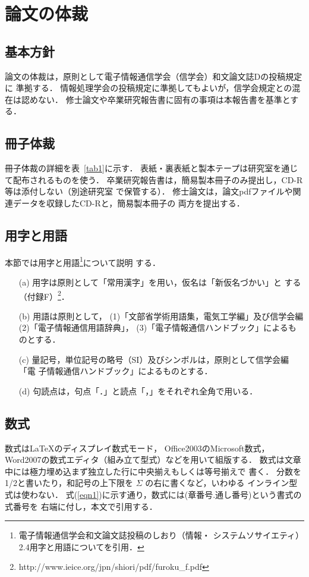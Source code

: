 \documentclass[main]{subfiles}
\begin{document}
\chapter{論文の体裁}
\section{基本方針}
論文の体裁は，原則として電子情報通信学会（信学会）和文論文誌Dの投稿規定に
準拠する．
情報処理学会の投稿規定に準拠してもよいが，信学会規定との混在は認めない．
修士論文や卒業研究報告書に固有の事項は本報告書を基準とする．

\section{冊子体裁}
冊子体裁の詳細を表~\ref{tab1}に示す．
表紙・裏表紙と製本テープは研究室を通じて配布されるものを使う．
卒業研究報告書は，簡易製本冊子のみ提出し，CD-R等は添付しない（別途研究室
で保管する）．
修士論文は，論文pdfファイルや関連データを収録したCD-Rと，簡易製本冊子の
両方を提出する．




\section{用字と用語}
本節では用字と用語\footnote{電子情報通信学会和文論文誌投稿のしおり（情報・
	システムソサイエティ） 2.4用字と用語についてを引用．}について説明
	する．
\begin{itemize}
\item[(a)] 用字は原則として「常用漢字」を用い，仮名は「新仮名づかい」と
	   する（付録F）\footnote{http://www.ieice.org/jpn/shiori/pdf/furoku\_f.pdf}．
\item[(b)] 用語は原則として，
(1)「文部省学術用語集，電気工学編」及び信学会編
(2)「電子情報通信用語辞典」，
(3)「電子情報通信ハンドブック」によるものとする．
\item[(c)] 量記号，単位記号の略号（SI）及びシンボルは，原則として信学会編「電
      子情報通信ハンドブック」によるものとする．
\item[(d)] 句読点は，句点「．」と読点「，」をそれぞれ全角で用いる．
\end{itemize}


\section{数式}
数式は\LaTeX のディスプレイ数式モード， Office2003のMicrosoft数式，
Word2007の数式エディタ（組み立て型式）などを用いて組版する．
数式は文章中には極力埋め込まず独立した行に中央揃えもしくは等号揃えで
書く．
分数を1/2と書いたり，和記号の上下限を $\Sigma$ の右に書くなど，いわゆる
インライン型式は使わない．
式(\ref{eqn1})に示す通り，数式には(章番号.通し番号)という書式の式番号を
右端に付し，本文で引用する．
\end{document}

